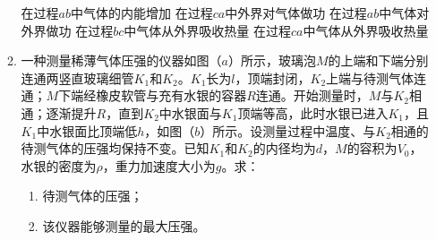 \begin{enumerate}[leftmargin=0em]
\begin{enumerate}
\fivechoices
{在过程$ ab $中气体的内能增加}
{在过程$ ca $中外界对气体做功}
{在过程$ ab $中气体对外界做功}
{在过程$ bc $中气体从外界吸收热量}
{在过程$ ca $中气体从外界吸收热量}

\item 
一种测量稀薄气体压强的仪器如图（$ a $）所示，玻璃泡$ M $的上端和下端分别连通两竖直玻璃细管$ K_{1} $和$ K_{2} $。$ K_{1} $长为$ l $，顶端封闭，$ K_{2} $上端与待测气体连通；$ M $下端经橡皮软管与充有水银的容器$ R $连通。开始测量时，$ M $与$ K_{2} $相通；逐渐提升$ R $，直到$ K_{2} $中水银面与$ K_{1} $顶端等高，此时水银已进入$ K_{1} $，且$ K_{1} $中水银面比顶端低$ h $，如图（$ b $）所示。设测量过程中温度、与$ K_{2} $相通的待测气体的压强均保持不变。已知$ K_{1} $和$ K_{2} $的内径均为$ d $，$ M $的容积为$ V_{0} $，水银的密度为$ \rho $，重力加速度大小为$ g $。求：
\begin{enumerate}
\renewcommand{\labelenumi}{\arabic{enumi}.}
\item
待测气体的压强；
\item 
该仪器能够测量的最大压强。



\end{enumerate}


\begin{minipage}[h!]{0.5\linewidth}
\vspace{0.3em}

\vspace{0.3em}
\end{minipage}
\hfill
\begin{minipage}[h!]{0.5\linewidth}
\flushright
\vspace{0.3em}

\vspace{0.3em}
\end{minipage}





\end{enumerate}
\end{enumerate}
